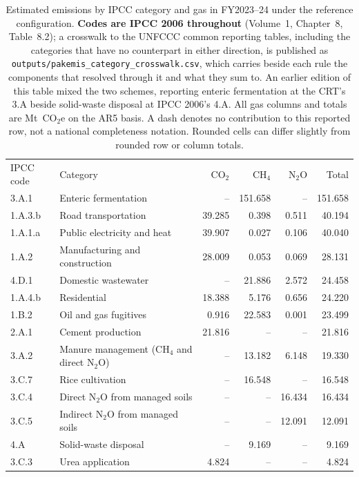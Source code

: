 \documentclass[essd]{copernicus}
\begin{document}
\begin{table}[t]
\caption{Estimated emissions by IPCC category and gas in FY2023--24 under the reference configuration. \textbf{Codes are IPCC 2006 throughout} (Volume~1, Chapter~8, Table~8.2); a crosswalk to the UNFCCC common reporting tables, including the categories that have no counterpart in either direction, is published as \texttt{outputs/pakemis\_category\_crosswalk.csv}, which carries beside each rule the components that resolved through it and what they sum to. An earlier edition of this table mixed the two schemes, reporting enteric fermentation at the CRT's 3.A beside solid-waste disposal at IPCC 2006's 4.A. All gas columns and totals are Mt~CO$_2$e on the AR5 basis. A dash denotes no contribution to this reported row, not a national completeness notation. Rounded cells can differ slightly from rounded row or column totals.}
\label{tab:categories}
\small
\begin{tabular}{lp{}rrrr}
\tophline
IPCC code & Category & CO$_2$ & CH$_4$ & N$_2$O & Total \\
\middlehline
3.A.1 & Enteric fermentation & -- & 151.658 & -- & 151.658 \\
1.A.3.b & Road transportation & 39.285 & 0.398 & 0.511 & 40.194 \\
1.A.1.a & Public electricity and heat & 39.907 & 0.027 & 0.106 & 40.040 \\
1.A.2 & Manufacturing and construction & 28.009 & 0.053 & 0.069 & 28.131 \\
4.D.1 & Domestic wastewater & -- & 21.886 & 2.572 & 24.458 \\
1.A.4.b & Residential & 18.388 & 5.176 & 0.656 & 24.220 \\
1.B.2 & Oil and gas fugitives & 0.916 & 22.583 & 0.001 & 23.499 \\
2.A.1 & Cement production & 21.816 & -- & -- & 21.816 \\
3.A.2 & Manure management (CH$_4$ and direct N$_2$O) & -- & 13.182 & 6.148 & 19.330 \\
3.C.7 & Rice cultivation & -- & 16.548 & -- & 16.548 \\
3.C.4 & Direct N$_2$O from managed soils & -- & -- & 16.434 & 16.434 \\
3.C.5 & Indirect N$_2$O from managed soils & -- & -- & 12.091 & 12.091 \\
4.A & Solid-waste disposal & -- & 9.169 & -- & 9.169 \\
3.C.3 & Urea application & 4.824 & -- & -- & 4.824 \\

\end{tabular}
\end{table}
\end{document}
